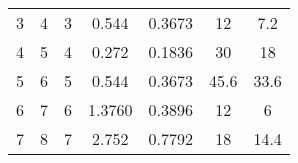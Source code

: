 \begin{table}[]
\begin{tabular}{@{}ccccccc@{}}
3                                                            & 4                                                               & 3                                                    & 0.544                                                                           & 0.3673                                                                        & 12                                                                              & 7.2                                                                                  \\
4                                                            & 5                                                               & 4                                                    & 0.272                                                                           & 0.1836                                                                        & 30                                                                              & 18                                                                                   \\
5                                                            & 6                                                               & 5                                                    & 0.544                                                                           & 0.3673                                                                        & 45.6                                                                            & 33.6                                                                                 \\
6                                                            & 7                                                               & 6                                                    & 1.3760                                                                          & 0.3896                                                                        & 12                                                                              & 6                                                                                    \\
7                                                            & 8                                                               & 7                                                    & 2.752                                                                           & 0.7792                                                                        & 18                                                                              & 14.4                                                                                 \\

\end{tabular}
\end{table}
